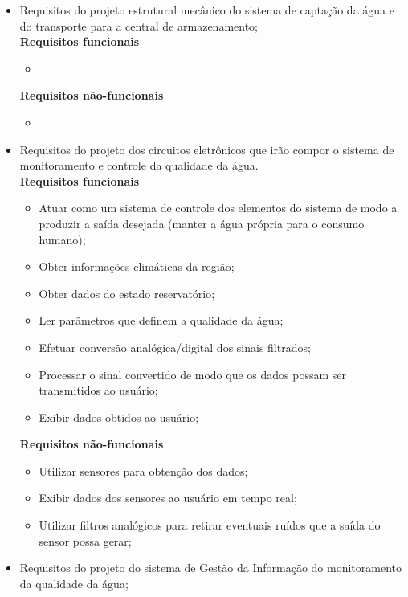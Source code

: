       \begin{itemize}
	\item Requisitos do projeto estrutural mecânico do sistema de captação da água e do transporte para a central de armazenamento;\\
	 
	 \textbf{Requisitos funcionais}
	  \begin{itemize}
	   \item 
	  \end{itemize}
	  
	  \textbf{Requisitos não-funcionais}
	  \begin{itemize}
	   \item 
	  \end{itemize}
	  
	\item Requisitos do projeto dos circuitos eletrônicos que irão compor o sistema de monitoramento e controle da qualidade da água.\\
	 
	 \textbf{Requisitos funcionais}
	  \begin{itemize}
	   \item Atuar como um sistema de controle dos elementos do sistema de modo a produzir a saída desejada (manter a água própria para o consumo humano);
	   \item Obter informações climáticas da região;
	   \item Obter dados do estado reservatório;
	   \item Ler parâmetros que definem a qualidade da água;
	   \item Efetuar conversão analógica/digital dos sinais filtrados;
	   \item Processar o sinal convertido de modo que os dados possam ser transmitidos ao usuário;
	   \item Exibir dados obtidos ao usuário;
	  \end{itemize}
	  
	  \textbf{Requisitos não-funcionais}
	  \begin{itemize}
	   \item Utilizar sensores para obtenção dos dados;
	   \item Exibir dados dos sensores ao usuário em tempo real;
	   \item Utilizar filtros analógicos para retirar eventuais ruídos que a saída do sensor possa gerar;
	  \end{itemize}
	  
	\item Requisitos do projeto do sistema de Gestão da Informação do monitoramento da qualidade da água;\\
	 

\end{itemize}
